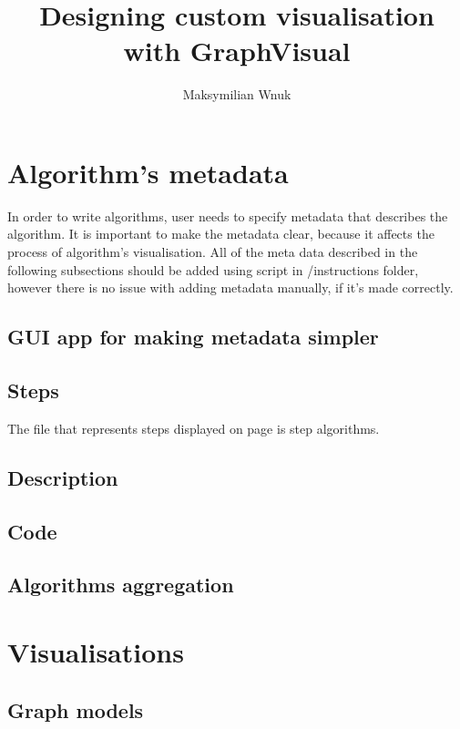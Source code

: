 \documentclass[12pt, letterpaper]{article}
\title{Designing custom visualisation with GraphVisual}
\author{Maksymilian Wnuk}
\begin{document}
\maketitle
\vspace{5cm}


\pagebreak
\tableofcontents
\pagebreak

\section{Algorithm's metadata}
In order to write algorithms, user needs to specify 
metadata that describes the algorithm. It is important
to make the metadata clear, because it affects the 
process of algorithm's visualisation. All of the
meta data described in the following subsections
should be added using script in /instructions folder,
however there is no issue with adding metadata manually,
if it's made correctly.

\subsection{GUI app for making metadata simpler}

\subsection{Steps}
The file that represents steps displayed on page
is step algorithms.

\subsection{Description}

\subsection{Code}

\subsection{Algorithms aggregation}

\clearpage

\section{Visualisations}

\subsection{Graph models}
\end{document}
